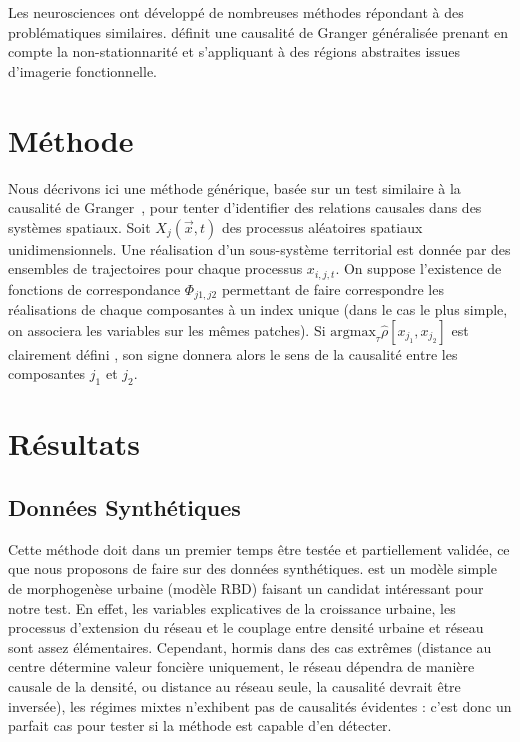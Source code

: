 \documentclass[french]{./sageo}
\begin{document}
Les neurosciences ont développé de nombreuses méthodes répondant à des problématiques similaires. \cite{luo2013spatio} définit une causalité de Granger généralisée prenant en compte la non-stationnarité et s'appliquant à des régions abstraites issues d'imagerie fonctionnelle.



\section{Méthode}


Nous décrivons ici une méthode générique, basée sur un test similaire à la causalité de Granger~\cite{}, pour tenter d'identifier des relations causales dans des systèmes spatiaux. Soit $X_j(\vec{x},t)$ des processus aléatoires spatiaux unidimensionnels. Une réalisation d'un sous-système territorial est donnée par des ensembles de trajectoires pour chaque processus $x_{i,j,t}$. On suppose l'existence de fonctions de correspondance $\Phi_{j1,j2}$ permettant de faire correspondre les réalisations de chaque composantes à un index unique (dans le cas le plus simple, on associera les variables sur les mêmes patches). Si $\textrm{argmax}_{\tau} \hat{\rho}\left[x_{j_1},x_{j_2}\right]$ est clairement défini %
, son signe donnera alors le sens de la causalité entre les composantes $j_1$ et $j_2$.









\section{Résultats}


\subsection{Données Synthétiques}

Cette méthode doit dans un premier temps être testée et partiellement validée, ce que nous proposons de faire sur des données synthétiques. %
 \cite{raimbault2014hybrid} est un modèle simple de morphogenèse urbaine (modèle RBD) faisant un candidat intéressant pour notre test. En effet, les variables explicatives de la croissance urbaine, les processus d'extension du réseau et le couplage entre densité urbaine et réseau sont assez élémentaires. Cependant, hormis dans des cas extrêmes (distance au centre détermine valeur foncière uniquement, le réseau dépendra de manière causale de la densité, ou distance au réseau seule, la causalité devrait être inversée), les régimes mixtes n'exhibent pas de causalités évidentes : c'est donc un parfait cas pour tester si la méthode est capable d'en détecter.
\end{document}
